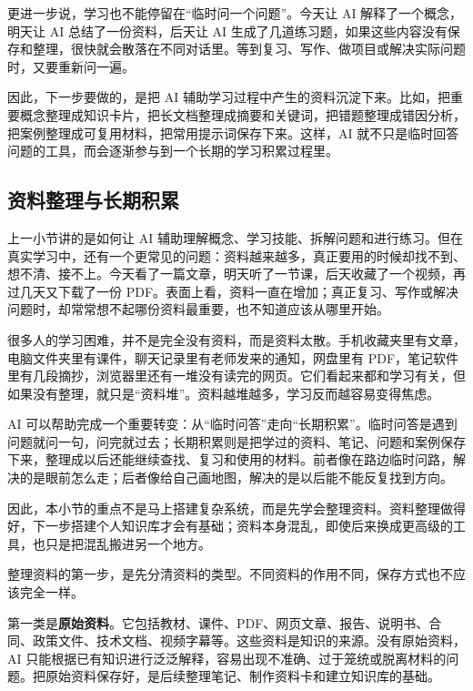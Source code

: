 更进一步说，学习也不能停留在“临时问一个问题”。今天让 AI 解释了一个概念，明天让 AI 总结了一份资料，后天让 AI 生成了几道练习题，如果这些内容没有保存和整理，很快就会散落在不同对话里。等到复习、写作、做项目或解决实际问题时，又要重新问一遍。

因此，下一步要做的，是把 AI 辅助学习过程中产生的资料沉淀下来。比如，把重要概念整理成知识卡片，把长文档整理成摘要和关键词，把错题整理成错因分析，把案例整理成可复用材料，把常用提示词保存下来。这样，AI 就不只是临时回答问题的工具，而会逐渐参与到一个长期的学习积累过程里。

\subsection{资料整理与长期积累}

上一小节讲的是如何让 AI 辅助理解概念、学习技能、拆解问题和进行练习。但在真实学习中，还有一个更常见的问题：资料越来越多，真正要用的时候却找不到、想不清、接不上。今天看了一篇文章，明天听了一节课，后天收藏了一个视频，再过几天又下载了一份 PDF。表面上看，资料一直在增加；真正复习、写作或解决问题时，却常常想不起哪份资料最重要，也不知道应该从哪里开始。

很多人的学习困难，并不是完全没有资料，而是资料太散。手机收藏夹里有文章，电脑文件夹里有课件，聊天记录里有老师发来的通知，网盘里有 PDF，笔记软件里有几段摘抄，浏览器里还有一堆没有读完的网页。它们看起来都和学习有关，但如果没有整理，就只是“资料堆”。资料越堆越多，学习反而越容易变得焦虑。

AI 可以帮助完成一个重要转变：从“临时问答”走向“长期积累”。临时问答是遇到问题就问一句，问完就过去；长期积累则是把学过的资料、笔记、问题和案例保存下来，整理成以后还能继续查找、复习和使用的材料。前者像在路边临时问路，解决的是眼前怎么走；后者像给自己画地图，解决的是以后能不能反复找到方向。

因此，本小节的重点不是马上搭建复杂系统，而是先学会整理资料。资料整理做得好，下一步搭建个人知识库才会有基础；资料本身混乱，即使后来换成更高级的工具，也只是把混乱搬进另一个地方。


整理资料的第一步，是先分清资料的类型。不同资料的作用不同，保存方式也不应该完全一样。

第一类是\textbf{原始资料}。它包括教材、课件、PDF、网页文章、报告、说明书、合同、政策文件、技术文档、视频字幕等。这些资料是知识的来源。没有原始资料，AI 只能根据已有知识进行泛泛解释，容易出现不准确、过于笼统或脱离材料的问题。把原始资料保存好，是后续整理笔记、制作资料卡和建立知识库的基础。

